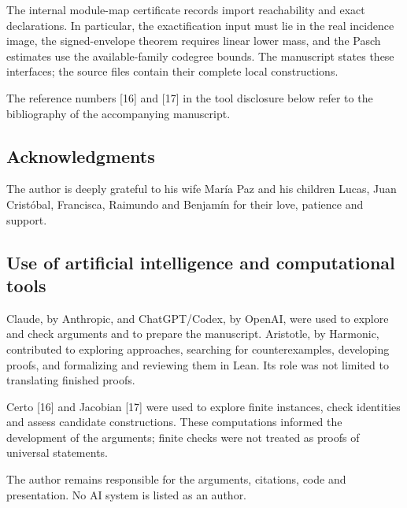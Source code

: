 \documentclass[english,11pt,a4paper]{article}
\begin{document}
The internal module-map certificate records import reachability and exact declarations. In particular, the exactification input must lie in the real incidence image, the signed-envelope theorem requires linear lower mass, and the Pasch estimates use the available-family codegree bounds. The manuscript states these interfaces; the source files contain their complete local constructions.

The reference numbers {[}16{]} and {[}17{]} in the tool disclosure below refer to the bibliography of the accompanying manuscript.

\subsection{Acknowledgments}\label{acknowledgments}

The author is deeply grateful to his wife María Paz and his children Lucas, Juan Cristóbal, Francisca, Raimundo and Benjamín for their love, patience and support.

\subsection{Use of artificial intelligence and computational tools}\label{use-of-artificial-intelligence-and-computational-tools}

Claude, by Anthropic, and ChatGPT/Codex, by OpenAI, were used to explore and check arguments and to prepare the manuscript. Aristotle, by Harmonic, contributed to exploring approaches, searching for counterexamples, developing proofs, and formalizing and reviewing them in Lean. Its role was not limited to translating finished proofs.

Certo {[}16{]} and Jacobian {[}17{]} were used to explore finite instances, check identities and assess candidate constructions. These computations informed the development of the arguments; finite checks were not treated as proofs of universal statements.

The author remains responsible for the arguments, citations, code and presentation. No AI system is listed as an author.
\end{document}
